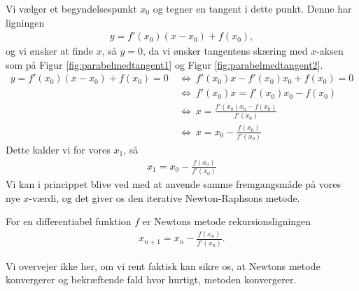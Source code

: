 Vi vælger et begyndelsespunkt $x_0$ og tegner en tangent i dette punkt. Denne har ligningen 
\begin{align*}
	y = f'(x_0)(x - x_0) + f(x_0),
\end{align*}
og vi ønsker at finde $x$, så $y = 0$, da vi ønsker tangentens skæring med $x$-aksen som på Figur \ref{fig:parabelmedtangent1} og Figur \ref{fig:parabelmedtangent2}.
\begin{align*}
	y = f'(x_0)(x-x_0) + f(x_0) = 0 \ &\Leftrightarrow \ 
	f'(x_0)x - f'(x_0)x_0 + f(x_0) = 0 \\
	&\Leftrightarrow \ f'(x_0)x = f'(x_0)x_0 - f(x_0)\\
	&\Leftrightarrow \ x = \frac{f'(x_0)x_0-f(x_0)}{f'(x_0)}\\
	&\Leftrightarrow \ x = x_0 - \frac{f(x_0)}{f'(x_0)}
\end{align*}
Dette kalder vi for vores $x_1$, så
\begin{align*}
	x_1 = x_0 -\frac{f(x_0)}{f'(x_0)}
\end{align*}
Vi kan i princippet blive ved med at anvende samme fremgangsmåde på vores nye $x$-værdi, og det giver os den iterative Newton-Raphsons metode.
\begin{defn}
	For en differentiabel funktion $f$ er Newtons metode rekursionsligningen 
	\begin{align*}
		x_{n+1} = x_n - \frac{f(x_n)}{f'(x_n)}.
	\end{align*}
\end{defn}
Vi overvejer ikke her, om vi rent faktisk kan sikre os, at Newtons metode konvergerer og bekræftende fald hvor hurtigt, metoden konvergerer. 

